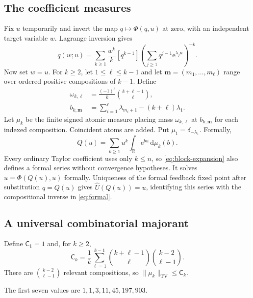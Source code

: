 \documentclass[11pt,a4paper]{article}
\numberwithin{equation}{section}
\theoremstyle{definition}
\theoremstyle{remark}
\newcommand{\R}{\mathbb R}
\newcommand{\U}{\widehat U}
\newcommand{\ee}{\mathrm e}
\newcommand{\dd}{\mathrm d}
\newcommand{\TV}{\mathrm{TV}}
\newcommand{\coeff}[2]{[#1^{#2}]}
\newcommand{\sh}{\mathsf C}
\begin{document}
\subsection{The coefficient measures}
Fix $u$ temporarily and invert the map $q\mapsto\Phi(q,u)$ at zero, with
an independent target variable $w$.  Lagrange inversion gives
\[
 q(w;u)=\sum_{k\ge1}\frac{w^k}{k}
       \coeff{q}{k-1}
       \left(\sum_{j\ge1}q^{j-1}\ee^{\lambda_j u}\right)^{-k}.
\]
Now set $w=u$.  For $k\ge2$, let $1\le\ell\le k-1$ and let
$\mathbf m=(m_1,\ldots,m_\ell)$ range over ordered positive compositions
of $k-1$.  Define
\begin{align}
 \omega_{k,\ell}&=\frac{(-1)^\ell}{k}
                         \binom{k+\ell-1}{\ell},\label{eq:weight}\\
 b_{k,\mathbf m}&=\sum_{i=1}^\ell\lambda_{m_i+1}
                              -(k+\ell)\lambda_1.\label{eq:frequency}
\end{align}
Let $\mu_k$ be the finite signed atomic measure placing mass
$\omega_{k,\ell}$ at $b_{k,\mathbf m}$ for each indexed composition.
Coincident atoms are added.  Put $\mu_1=\delta_{-\lambda_1}$.  Formally,
\begin{equation}
 \boxed{\quad Q(u)=\sum_{k\ge1}u^k\int_\R\ee^{bu}\,\dd\mu_k(b).\quad}
 \label{eq:block-expansion}
\end{equation}
Every ordinary Taylor coefficient uses only $k\le n$, so
\eqref{eq:block-expansion} also defines a formal series without convergence
hypotheses.  It solves $u=\Phi(Q(u),u)$ formally.  Uniqueness of the
formal feedback fixed point after substitution $q=Q(u)$ gives
$\U(Q(u))=u$, identifying this series with the compositional inverse
in \eqref{eq:formal}.

\subsection{A universal combinatorial majorant}
Define $\sh_1=1$ and, for $k\ge2$,
\begin{equation}
 \sh_k=\frac1k\sum_{\ell=1}^{k-1}
                \binom{k+\ell-1}{\ell}\binom{k-2}{\ell-1}.
 \label{eq:schroeder}
\end{equation}
There are $\binom{k-2}{\ell-1}$ relevant compositions, so
$\|\mu_k\|_{\TV}\le\sh_k$.

The first seven values are $1,1,3,11,45,197,903$.
\end{document}
